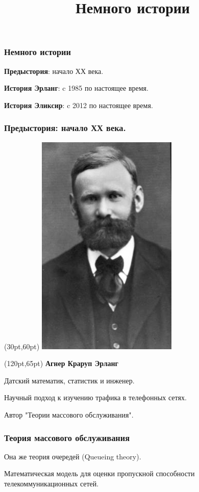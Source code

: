 \documentclass[10pt]{beamer}
\title{Немного истории}
\begin{document}
\begin{frame}
  \frametitle{Немного истории}
  \textbf{Предыстория}: начало ХХ века.
  \par \bigskip
  \textbf{История Эрланг}: c 1985 по настоящее время.
  \par \bigskip
  \textbf{История Эликсир}: c 2012 по настоящее время.
\end{frame}


\begin{frame}
  \frametitle{Предыстория: начало ХХ века.}
  \begin{textblock*}{70pt}(30pt,60pt)
    \includegraphics{agner_krarup_erlang}
  \end{textblock*}
  \begin{textblock*}{220pt}(120pt,65pt)
    \textbf{Агнер Краруп Эрланг}
    \par \bigskip
    Датский математик, статистик и инженер.
    \par \bigskip
    Научный подход к изучению трафика в телефонных сетях.
    \par \bigskip
    Автор "Теории массового обслуживания".
  \end{textblock*}
\end{frame}

\begin{frame}
  \frametitle{Теория массового обслуживания}
  Она же теория очередей (Queueing theory).
  \par \bigskip
  Математическая модель для оценки пропускной способности телекоммуникационных сетей.
\end{frame}
\end{document}

